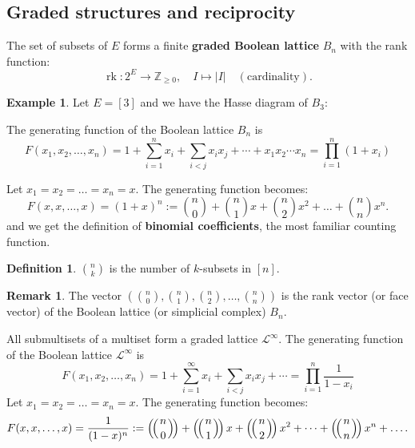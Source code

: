 \documentclass[12pt]{article}
\theoremstyle{definition}  %
\newtheorem{defi}[thm]{Definition}
\newtheorem{ex}[thm]{Example}
\newtheorem{remark}[thm]{Remark}
\numberwithin{equation}{subsection}
\newcommand{\multichoose}[2]{\left(\!\middle(\vphantom{n}\genfrac{}{}{0pt}{}{#1}{#2}\middle)\!\right)}%
\begin{document}
\subsection{Graded structures and reciprocity}
The set of subsets of $E$ forms a finite \textbf{graded Boolean lattice} $B_n$ with the rank function:
\[
\operatorname{rk}: 2^{E} \to \mathbb{Z}_{\geq 0}, \quad I \mapsto |I| \quad (\text{cardinality}).
\]
\begin{ex}
Let $E = [3]$ and we have the Hasse diagram of $B_3$:
    \begin{center}
\end{center}

\end{ex}


The generating function of the Boolean lattice $B_n$ is 
\[
F(x_1, x_2, \ldots, x_n) = 1 + \sum_{i=1}^n x_i + \sum_{i < j} x_i x_j + \cdots + x_1 x_2 \cdots x_n = \prod_{i = 1}^{n} (1 + x_i)
\]


Let $x_1 = x_2 = \dots = x_n = x$. The generating function becomes:
\[
F(x, x, \dots, x) = (1 + x)^n := \binom{n}{0} + \binom{n}{1}x + \binom{n}{2}x^2 + \dots + \binom{n}{n}x^n.
\]
and we get the definition of \textbf{binomial coefficients}, the most familiar counting function.
\begin{defi}
    $\binom{n}{k}$ is the number of $k$-subsets in $[n]$.
\end{defi}

\begin{remark}
    The vector $\left(\binom{n}{0}, \binom{n}{1}, \binom{n}{2}, \dots, \binom{n}{n}\right)$ is the rank vector (or face vector) of the Boolean lattice (or simplicial complex) $B_n$.
\end{remark}

All submultisets of a multiset form a graded lattice $\mathcal{L^{\infty}}$. The generating function of the Boolean lattice $\mathcal{L^{\infty}}$ is 
\[
F(x_1, x_2, \ldots, x_n) = 1 + \sum_{i=1}^{\infty} x_i + \sum_{i < j} x_i x_j + \cdots = \prod_{i = 1}^{n} \frac{1}{1 - x_i}
\]
Let $x_1 = x_2 = \dots = x_n = x$. The generating function becomes:
\[
F(x, x, \dots, x) = \frac{1}{(1 - x)^n} := \multichoose{n}{0} + \multichoose{n}{1}x + \multichoose{n}{2}x^2 + \dots + \multichoose{n}{n}x^n + \ldots.
\]
\end{document}
